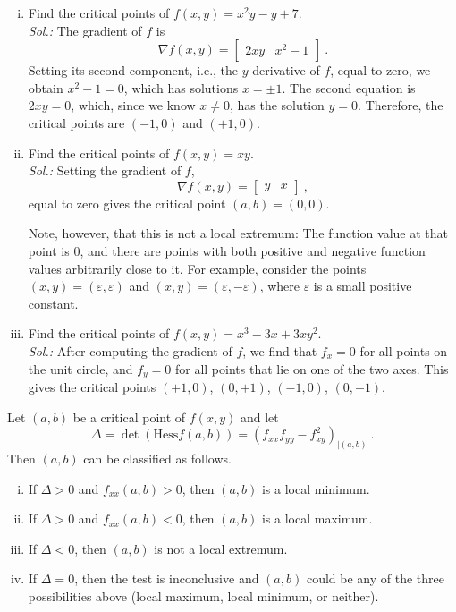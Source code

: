 \begin{example}
\label{expl:crit_points}
	\begin{enumerate}[(i)]
		\item Find the critical points of $f(x,y) = x^2y - y + 7$.\\
		{\it Sol.:}
		The gradient of $f$ is 
		\[  \nabla f (x,y) = \begin{bmatrix} 2xy & x^2-1 \end{bmatrix} \:. \]
		Setting its second component, i.e., the $y$-derivative of $f$, equal to zero, we obtain $x^2-1=0$, which has solutions $x=\pm1$. The second equation is $2xy=0$, which, since we know $x\not=0$, has the solution $y=0$. Therefore, the critical points are $(-1,0)$ and $(+1,0)$.
		\item Find the critical points of $f(x,y) = xy$.\\
		{\it Sol.:}
		Setting the gradient of $f$,
		\[  \nabla f (x,y) = \begin{bmatrix} y & x \end{bmatrix} \:, \]
		equal to zero gives the critical point $(a,b)=(0,0)$.
		
		Note, however, that this is not a local extremum: The function value at that point is $0$, and there are points with both positive and negative function values arbitrarily close to it. For example, consider the points $(x,y)=(\varepsilon,\varepsilon)$ and $(x,y)=(\varepsilon,-\varepsilon)$, where $\varepsilon$ is a small positive constant.
		\item Find the critical points of $f(x,y) = x^3 - 3x + 3xy^2$.\\
		{\it Sol.:}
		After computing the gradient of $f$, we find that $f_x=0$ for all points on the unit circle, and $f_y=0$ for all points that lie on one of the two axes. This gives the critical points $(+1,0)$, $(0,+1)$, $(-1,0)$, $(0,-1)$.
	\end{enumerate}
\end{example}

\begin{theorem}
Let $(a,b)$ be a critical point of $f(x,y)$ and let 
\[ \Delta = \det \left( \mathrm{Hess} f (a,b) \right) 
= \left( f_{xx}f_{yy}-f_{xy}^2 \right)_{|(a,b)} \:. \]
Then $(a,b)$ can be classified as follows.
\begin{enumerate}[(i)]
	\item If $\Delta > 0$ and $f_{xx}(a,b)>0$, then $(a,b)$ is a local minimum.
	\item If $\Delta > 0$ and $f_{xx}(a,b)<0$, then $(a,b)$ is a local maximum.
	\item If $\Delta < 0$, then $(a,b)$ is not a local extremum.
	\item If $\Delta = 0$, then the test is inconclusive and $(a,b)$ could be any of the three possibilities above (local maximum, local minimum, or neither).
\end{enumerate}
\end{theorem}

